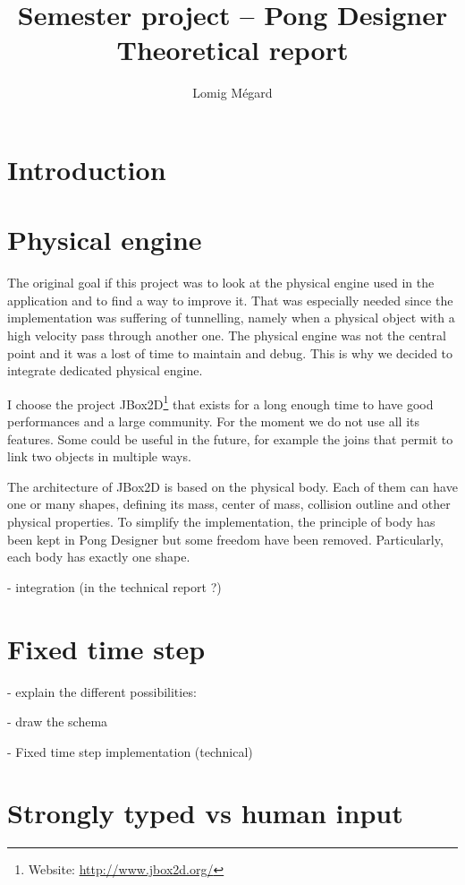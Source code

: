 \documentclass[11pt,a4paper]{article}
\title{Semester project -- Pong Designer\\Theoretical report}
\author{Lomig Mégard}
\begin{document}
\maketitle

\section{Introduction}

\section{Physical engine}
The original goal if this project was to look at the physical engine used in the application and to find a way to improve it. That was especially needed since the implementation was suffering of tunnelling, namely when a physical object with a high velocity pass through another one. The physical engine was not the central point and it was a lost of time to maintain and debug. This is why we decided to integrate dedicated physical engine. 

I choose the project JBox2D\footnote{Website: \url{http://www.jbox2d.org/}} that exists for a long enough time to have good performances and a large community. For the moment we do not use all its features. Some could be useful in the future, for example the joins that permit to link two objects in multiple ways.

The architecture of JBox2D is based on the physical body. Each of them can have one or many shapes, defining its mass, center of mass, collision outline and other physical properties. To simplify the implementation, the principle of body has been kept in Pong Designer but some freedom have been removed. Particularly, each body has exactly one shape.

- integration (in the technical report ?)

\section{Fixed time step}

- explain the different possibilities:
  
- draw the schema

- Fixed time step implementation (technical)

\section{Strongly typed vs human input}
\end{document}
